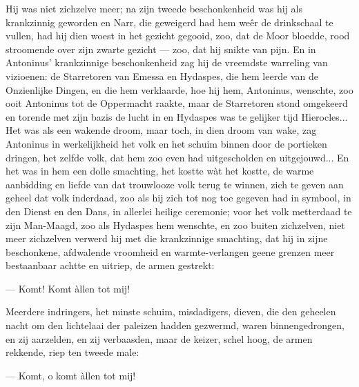 \documentclass[a4paper, 12pt, oneside, dutch]{article}
\begin{document}
Hij was niet zichzelve meer; na zijn tweede beschonkenheid was hij als krankzinnig geworden en Narr, die geweigerd had hem weêr de drinkschaal te vullen, had hij dien woest in het gezicht gegooid, zoo, dat de Moor bloedde, rood stroomende over zijn zwarte gezicht --- zoo, dat hij snikte van pijn. En in Antoninus' krankzinnige beschonkenheid zag hij de vreemdste warreling van vizioenen: de Starretoren van Emessa en Hydaspes, die hem leerde van de Onzienlijke Dingen, en die hem verklaarde, hoe hij hem, Antoninus, wenschte, zoo ooit Antoninus tot de Oppermacht raakte, maar de Starretoren stond omgekeerd en torende met zijn bazis de lucht in en Hydaspes was te gelijker tijd Hierocles... Het was als een wakende droom, maar toch, in dien droom van wake, zag Antoninus in werkelijkheid het volk en het schuim binnen door de portieken dringen, het zelfde volk, dat hem zoo even had uitgescholden en uitgejouwd... En het was in hem een dolle smachting, het kostte wàt het kostte, de warme aanbidding en liefde van dat trouwlooze volk terug te winnen, zich te geven aan geheel dat volk inderdaad, zoo als hij zich tot nog toe gegeven had in symbool, in den Dienst en den Dans, in allerlei heilige ceremonie; voor het volk metterdaad te zijn Man-Maagd, zoo als Hydaspes hem wenschte, en zoo buiten zichzelven, niet meer zichzelven verwerd hij met die krankzinnige smachting, dat hij in zijne beschonkene, afdwalende vroomheid en warmte-verlangen geene grenzen meer bestaanbaar achtte en uitriep, de armen gestrekt:

--- Komt! Komt àllen tot mij!

Meerdere indringers, het minste schuim, misdadigers, dieven, die den geheelen nacht om den lichtelaai der paleizen hadden gezwermd, waren binnengedrongen, en zij aarzelden, en zij verbaasden, maar de keizer, schel hoog, de armen rekkende, riep ten tweede male:

--- Komt, o komt àllen tot mij!
\end{document}
